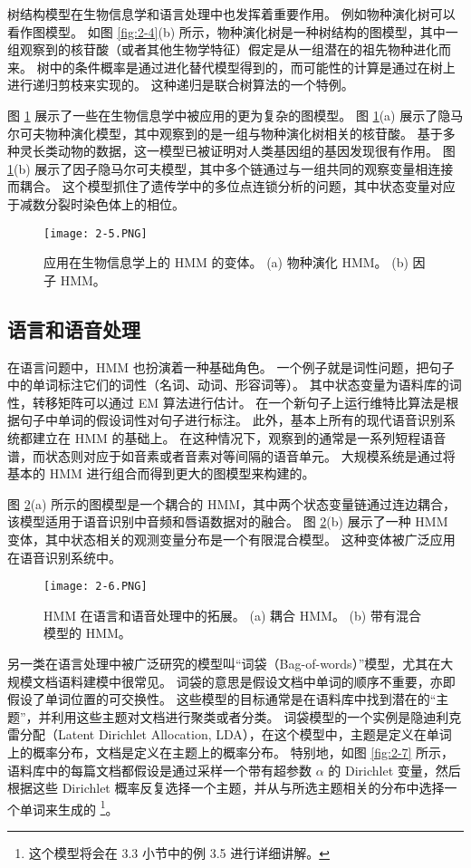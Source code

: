 树结构模型在生物信息学和语言处理中也发挥着重要作用。
例如物种演化树可以看作图模型。
如图 \ref{fig:2-4}(b) 所示，物种演化树是一种树结构的图模型，其中一组观察到的核苷酸（或者其他生物学特征）假定是从一组潜在的祖先物种进化而来。
树中的条件概率是通过进化替代模型得到的，而可能性的计算是通过在树上进行递归剪枝来实现的。
这种递归是联合树算法的一个特例。

图 \ref{fig:2-5} 展示了一些在生物信息学中被应用的更为复杂的图模型。
图 \ref{fig:2-5}(a) 展示了隐马尔可夫物种演化模型，其中观察到的是一组与物种演化树相关的核苷酸。
基于多种灵长类动物的数据，这一模型已被证明对人类基因组的基因发现很有作用。
图 \ref{fig:2-5}(b) 展示了因子隐马尔可夫模型，其中多个链通过与一组共同的观察变量相连接而耦合。
这个模型抓住了遗传学中的多位点连锁分析的问题，其中状态变量对应于减数分裂时染色体上的相位。

\begin{figure}[htbp]
    \centering
    \texttt{[image: 2-5.PNG]}
    \caption{
        应用在生物信息学上的 HMM 的变体。
        (a) 物种演化 HMM。
        (b) 因子 HMM。
    }\label{fig:2-5}
\end{figure}

\subsection{语言和语音处理}

在语言问题中，HMM 也扮演着一种基础角色。
一个例子就是词性问题，把句子中的单词标注它们的词性（名词、动词、形容词等）。
其中状态变量为语料库的词性，转移矩阵可以通过 EM 算法进行估计。
在一个新句子上运行维特比算法是根据句子中单词的假设词性对句子进行标注。
此外，基本上所有的现代语音识别系统都建立在 HMM 的基础上。
在这种情况下，观察到的通常是一系列短程语音谱，而状态则对应于如音素或者音素对等间隔的语音单元。
大规模系统是通过将基本的 HMM 进行组合而得到更大的图模型来构建的。

图 \ref{fig:2-6}(a) 所示的图模型是一个耦合的 HMM，其中两个状态变量链通过连边耦合，该模型适用于语音识别中音频和唇语数据对的融合。
图 \ref{fig:2-6}(b) 展示了一种 HMM 变体，其中状态相关的观测变量分布是一个有限混合模型。
这种变体被广泛应用在语音识别系统中。

\begin{figure}[htbp]
    \centering
    \texttt{[image: 2-6.PNG]}
    \caption{
        HMM 在语言和语音处理中的拓展。
        (a) 耦合 HMM。
        (b) 带有混合模型的 HMM。
    }\label{fig:2-6}
\end{figure}

另一类在语言处理中被广泛研究的模型叫“词袋（Bag-of-words）”模型，尤其在大规模文档语料建模中很常见。
词袋的意思是假设文档中单词的顺序不重要，亦即假设了单词位置的可交换性。
这些模型的目标通常是在语料库中找到潜在的“主题”，并利用这些主题对文档进行聚类或者分类。
词袋模型的一个实例是隐迪利克雷分配（Latent Dirichlet Allocation, LDA），在这个模型中，主题是定义在单词上的概率分布，文档是定义在主题上的概率分布。
特别地，如图 \ref{fig:2-7} 所示，语料库中的每篇文档都假设是通过采样一个带有超参数 $\alpha$ 的 Dirichlet 变量，然后根据这些 Dirichlet 概率反复选择一个主题，并从与所选主题相关的分布中选择一个单词来生成的 \footnote{这个模型将会在 3.3 小节中的例 3.5 进行详细讲解。}。

